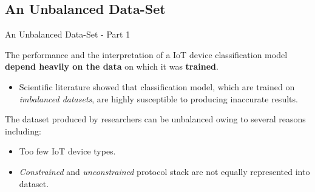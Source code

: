 \documentclass[10pt]{beamer}
\begin{document}
\subsection{An Unbalanced Data-Set}
\begin{frame}{An Unbalanced Data-Set - Part 1}

\begin{block}{}
\justifying
The performance and the interpretation of a IoT device classification model \textbf{depend heavily on the data} on which it was \textbf{trained}. 

\begin{itemize}
\justifying
\item Scientific literature showed that classification model, which are trained on \textit{imbalanced datasets}, are highly susceptible to producing inaccurate results. 
\end{itemize}
\end{block}

\begin{block}{}
The dataset produced by researchers can be unbalanced owing to several reasons including:

\begin{itemize}
\item Too few IoT device types.
\item \textit{Constrained} and \textit{unconstrained} protocol stack are not equally represented into dataset.
\end{itemize}

\end{block}

\end{frame} 
\end{document}
